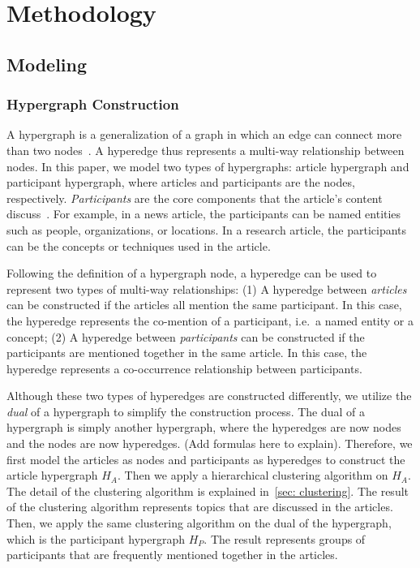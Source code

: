 \section{Methodology}
\subsection{Modeling}
\subsubsection{Hypergraph Construction}
A hypergraph is a generalization of a graph in which an edge can connect more than two nodes~\cite{hypergraph_definition}.
A hyperedge thus represents a multi-way relationship between nodes.
In this paper, we model two types of hypergraphs: article hypergraph and participant hypergraph, where articles and participants are the nodes, respectively.
\textit{Participants} are the core components that the article's content discuss~\cite{use_other_works_to_refine_definition}.
For example, in a news article, the participants can be named entities such as people, organizations, or locations.
In a research article, the participants can be the concepts or techniques used in the article.

Following the definition of a hypergraph node, a hyperedge can be used to represent two types of multi-way relationships:
(1) A hyperedge between \textit{articles} can be constructed if the articles all mention the same participant. 
In this case, the hyperedge represents the co-mention of a participant, i.e.\ a named entity or a concept;
(2) A hyperedge between \textit{participants} can be constructed if the participants are mentioned together in the same article.
In this case, the hyperedge represents a co-occurrence relationship between participants.

Although these two types of hyperedges are constructed differently, we utilize the \textit{dual} of a hypergraph to simplify the construction process.
The dual of a hypergraph is simply another hypergraph, where the hyperedges are now nodes and the nodes are now hyperedges. (Add formulas here to explain).
Therefore, we first model the articles as nodes and participants as hyperedges to construct the article hypergraph $H_A$.
Then we apply a hierarchical clustering algorithm on $H_A$.
The detail of the clustering algorithm is explained in~\autoref{sec: clustering}.
The result of the clustering algorithm represents topics that are discussed in the articles.
Then, we apply the same clustering algorithm on the dual of the hypergraph, which is the participant hypergraph $H_P$.
The result represents groups of participants that are frequently mentioned together in the articles.

